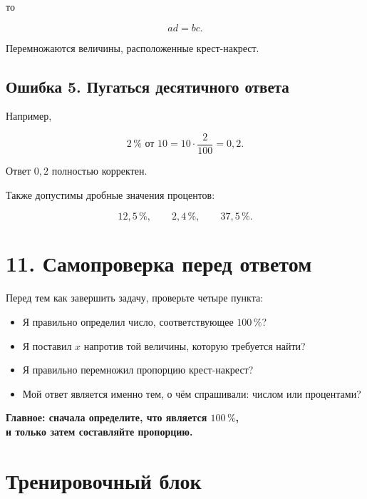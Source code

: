 \documentclass[a4paper,12pt]{article}
\newcommand{\pct}[1]{#1\,\%}
\begin{document}
то

\[
\boxed{ad=bc}.
\]

Перемножаются величины, расположенные крест-накрест.

\subsection*{Ошибка 5. Пугаться десятичного ответа}

Например,

\[
\pct{2}\text{ от }10
=
10\cdot\frac{2}{100}
=
0{,}2.
\]

Ответ \(0{,}2\) полностью корректен.

Также допустимы дробные значения процентов:

\[
\pct{12,5},\qquad
\pct{2,4},\qquad
\pct{37,5}.
\]


\section*{\textcolor{darkaccent}{11. Самопроверка перед ответом}}

Перед тем как завершить задачу, проверьте четыре пункта:

\begin{itemize}
    \item Я правильно определил число, соответствующее \(\pct{100}\)?
    \item Я поставил \(x\) напротив той величины, которую требуется найти?
    \item Я правильно перемножил пропорцию крест-накрест?
    \item Мой ответ является именно тем, о чём спрашивали: числом или процентами?
\end{itemize}

\bigskip

\begin{center}
\textcolor{darkaccent}{
\large\textbf{
Главное: сначала определите, что является \(\pct{100}\),\\
и только затем составляйте пропорцию.
}}
\end{center}


\newpage

\section*{\textcolor{darkaccent}{Тренировочный блок}}
\end{document}
